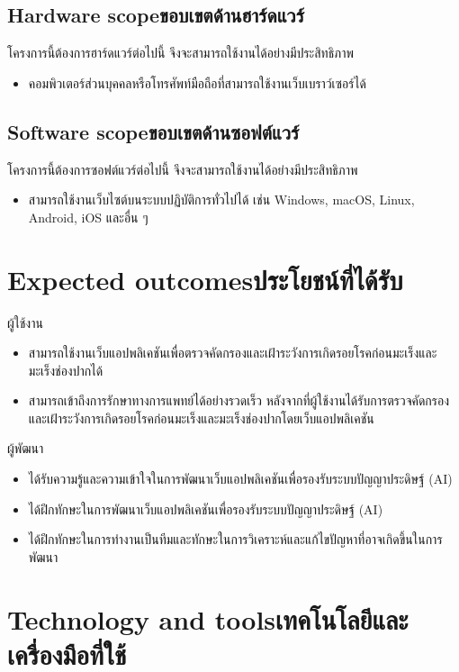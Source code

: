 \subsection{\ifenglish Hardware scope\else ขอบเขตด้านฮาร์ดแวร์\fi}
โครงการนี้ต้องการฮาร์ดแวร์ต่อไปนี้ จึงจะสามารถใช้งานได้อย่างมีประสิทธิภาพ
\begin{itemize}
    \item คอมพิวเตอร์ส่วนบุคคลหรือโทรศัพท์มือถือที่สามารถใช้งานเว็บเบราว์เซอร์ได้
\end{itemize}

\subsection{\ifenglish Software scope\else ขอบเขตด้านซอฟต์แวร์\fi}
โครงการนี้ต้องการซอฟต์แวร์ต่อไปนี้ จึงจะสามารถใช้งานได้อย่างมีประสิทธิภาพ
\begin{itemize}
    \item สามารถใช้งานเว็บไซต์บนระบบปฏิบัติการทั่วไปได้ เช่น Windows, macOS, Linux, Android, iOS และอื่น ๆ
\end{itemize}

\section{\ifenglish Expected outcomes\else ประโยชน์ที่ได้รับ\fi}
ผู้ใช้งาน
\begin{itemize}
    \item สามารถใช้งานเว็บแอปพลิเคชันเพื่อตรวจคัดกรองและเฝ้าระวังการเกิดรอยโรคก่อนมะเร็งและมะเร็งช่องปากได้
    \item สามารถเข้าถึงการรักษาทางการแพทย์ได้อย่างรวดเร็ว หลังจากที่ผู้ใช้งานได้รับการตรวจคัดกรองและเฝ้าระวังการเกิดรอยโรคก่อนมะเร็งและมะเร็งช่องปากโดยเว็บแอปพลิเคชัน
\end{itemize}
ผู้พัฒนา
\begin{itemize}
    \item ได้รับความรู้และความเข้าใจในการพัฒนาเว็บแอปพลิเคชันเพื่อรองรับระบบปัญญาประดิษฐ์ (AI)
    \item ได้ฝึกทักษะในการพัฒนาเว็บแอปพลิเคชันเพื่อรองรับระบบปัญญาประดิษฐ์ (AI)
    \item ได้ฝึกทักษะในการทำงานเป็นทีมและทักษะในการวิเคราะห์และแก้ไขปัญหาที่อาจเกิดขึ้นในการพัฒนา
\end{itemize}

\section{\ifenglish Technology and tools\else เทคโนโลยีและเครื่องมือที่ใช้\fi}

